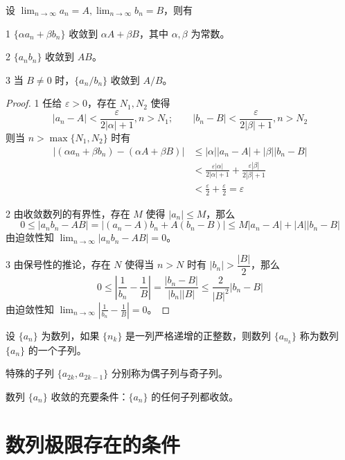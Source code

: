 \begin{theorem}[四则运算]
	设 $\displaystyle\lim_{n\to \infty} a_n = A,\displaystyle\lim_{n\to \infty} b_n = B$，则有

	\num{1} $\{\alpha a_n+\beta b_n\}$ 收敛到 $\alpha A+\beta B$，其中 $\alpha,\beta$ 为常数。

	\num{2} $\{a_nb_n\}$ 收敛到 $AB$。

	\num{3} 当 $B\ne 0$ 时，$\{a_n/b_n\}$ 收敛到 $A/B$。
\end{theorem}
\begin{proof}
	\num{1} 任给 $\varepsilon >0$，存在 $N_1,N_2$ 使得
	$$|a_n-A|<\frac{\varepsilon}{2|\alpha|+1},n>N_1;\qquad |b_n-B|<\frac{\varepsilon}{2|\beta|+1},n>N_2$$
	则当 $n>\max\{N_1,N_2\}$ 时有
	\begin{equation*}
		\begin{aligned}
			|(\alpha a_n+\beta b_n)-(\alpha A+\beta B)|&\leqslant |\alpha||a_n-A|+|\beta||b_n-B|\\
			&< \frac{\varepsilon|\alpha|}{2|\alpha|+1}+\frac{\varepsilon|\beta|}{2|\beta|+1}\\
			&< \frac{\varepsilon}2+\frac{\varepsilon}2=\varepsilon
		\end{aligned}
	\end{equation*}

	\num{2} 由收敛数列的有界性，存在 $M$ 使得 $|a_n|\leqslant M$，那么
	$$0\leqslant |a_nb_n-AB|=|(a_n-A)b_n+A(b_n-B)|\leqslant M|a_n-A|+|A||b_n-B|$$
	由迫敛性知 $\displaystyle\lim_{n\to \infty}|a_nb_n-AB| =0$。

	\num{3} 由保号性的推论，存在 $N$ 使得当 $n>N$ 时有 $|b_n|>\dfrac{|B|}{2}$，那么
	$$0 \leqslant \left|\frac{1}{b_n}-\frac{1}{B}\right| = \frac{|b_n-B|}{|b_n||B|} \leqslant \frac{2}{|B|^2}{|b_n-B|}$$
	由迫敛性知 $\displaystyle\lim_{n\to \infty}\left|\frac{1}{b_n}-\frac{1}{B}\right| =0$。
\end{proof}

\begin{definition}[数列的子列]
	设 $\{a_n\}$ 为数列，如果 $\{n_k\}$ 是一列严格递增的正整数，则数列 $\{a_{n_k}\}$ 称为数列 $\{a_n\}$ 的一个子列。
\end{definition}

特殊的子列 $\{a_{2k},a_{2k-1}\}$ 分别称为偶子列与奇子列。

\begin{theorem}
	数列 $\{a_n\}$ 收敛的充要条件：$\{a_n\}$ 的任何子列都收敛。
\end{theorem}

\section{数列极限存在的条件}

